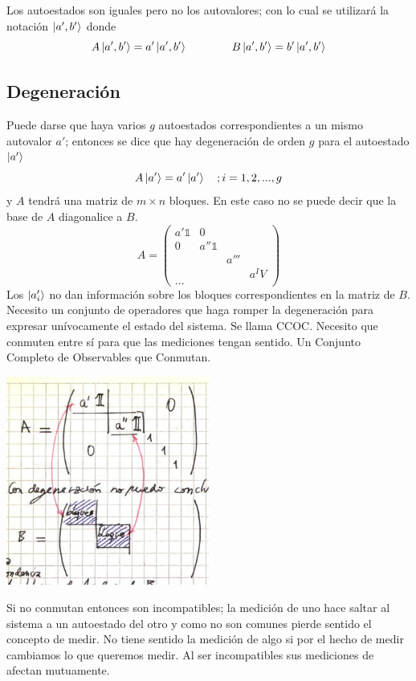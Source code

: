 \documentclass[10pt,oneside]{CBFT_book}
\begin{document}
Los autoestados son iguales pero no los autovalores; con lo cual se utilizará la notación $\Ket{a',b'}$ donde 
\[
	A \Ket{a',b'} = a' \Ket{a',b'} \qquad \qquad B \Ket{a',b'} = b' \Ket{a',b'}
\]

\subsection{Degeneración}

Puede darse que haya varios $g$ autoestados correspondientes a un mismo autovalor $a'$; entonces se dice que hay 
degeneración de orden $g$ para el autoestado $\Ket{a'}$
\[
	A\Ket{a'}= a'\Ket{a'} \quad ; i=1,2,...,g
\]
y $A$ tendrá una matriz de $m\times n$ bloques. 
En este caso no se puede decir que la base de $A$ diagonalice a $B$.
\[
	A = \begin{pmatrix}
	     a'\mathbb{1} & 0 & & \\
	     0 & a''\mathbb{1} & & \\
	     & & a'''& \\
	     & & & a^IV \\
	     ...
	    \end{pmatrix}
\]
Los $\ket{a'_i}$ no dan información sobre los bloques correspondientes en la matriz de $B$.
Necesito un conjunto de operadores que haga romper la degeneración para expresar unívocamente 
el estado del sistema. Se llama CCOC. Necesito que conmuten entre sí para que las mediciones tengan sentido.
Un Conjunto Completo de Observables que Conmutan.

\includegraphics[width=0.5\textwidth]{images/fig_ft2_matriz_degenerada1.jpg}

Si no conmutan entonces son incompatibles; la medición de uno hace saltar al sistema a un autoestado del otro y como no 
son comunes pierde sentido el concepto de medir. No tiene sentido la medición de algo si por el hecho de medir 
cambiamos lo que queremos medir.
Al ser incompatibles sus mediciones de afectan mutuamente.
\end{document}
